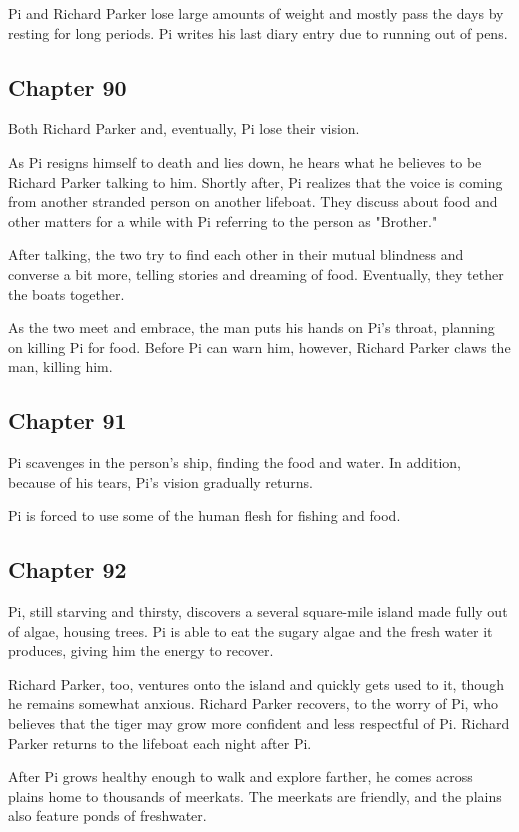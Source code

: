 \documentclass[11pt]{article}
\begin{document}
Pi and Richard Parker lose large amounts of weight and mostly pass the days by resting for long periods. Pi writes his last diary entry due to running out of pens.
\subsection{Chapter 90}
\label{sec:org32b2f7e}
Both Richard Parker and, eventually, Pi lose their vision.

As Pi resigns himself to death and lies down, he hears what he believes to be Richard Parker talking to him. Shortly after, Pi realizes that the voice is coming from another stranded person on another lifeboat. They discuss about food and other matters for a while with Pi referring to the person as "Brother."

After talking, the two try to find each other in their mutual blindness and converse a bit more, telling stories and dreaming of food. Eventually, they tether the boats together.

As the two meet and embrace, the man puts his hands on Pi's throat, planning on killing Pi for food. Before Pi can warn him, however, Richard Parker claws the man, killing him.
\subsection{Chapter 91}
\label{sec:org57d24ed}
Pi scavenges in the person's ship, finding the food and water. In addition, because of his tears, Pi's vision gradually returns.

Pi is forced to use some of the human flesh for fishing and food.
\subsection{Chapter 92}
\label{sec:orgf8c12f2}
Pi, still starving and thirsty, discovers a several square-mile island made fully out of algae, housing trees. Pi is able to eat the sugary algae and the fresh water it produces, giving him the energy to recover.

Richard Parker, too, ventures onto the island and quickly gets used to it, though he remains somewhat anxious. Richard Parker recovers, to the worry of Pi, who believes that the tiger may grow more confident and less respectful of Pi. Richard Parker returns to the lifeboat each night after Pi.

After Pi grows healthy enough to walk and explore farther, he comes across plains home to thousands of meerkats. The meerkats are friendly, and the plains also feature ponds of freshwater.
\end{document}
